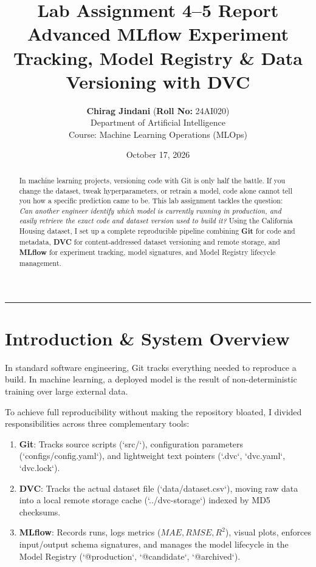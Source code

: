 \documentclass[11pt,a4paper]{article}
\title{\textbf{\Large Lab Assignment 4--5 Report}\\
\large Advanced MLflow Experiment Tracking, Model Registry \& Data Versioning with DVC}
\author{\textbf{Chirag Jindani} \quad (\textbf{Roll No:} 24AI020)\\
Department of Artificial Intelligence\\
Course: Machine Learning Operations (MLOps)}
\date{October 17, 2026}
\begin{document}
\maketitle
\thispagestyle{empty}

\begin{abstract}
In machine learning projects, versioning code with Git is only half the battle. If you change the dataset, tweak hyperparameters, or retrain a model, code alone cannot tell you how a specific prediction came to be. This lab assignment tackles the question: \textit{Can another engineer identify which model is currently running in production, and easily retrieve the exact code and dataset version used to build it?} Using the California Housing dataset, I set up a complete reproducible pipeline combining \textbf{Git} for code and metadata, \textbf{DVC} for content-addressed dataset versioning and remote storage, and \textbf{MLflow} for experiment tracking, model signatures, and Model Registry lifecycle management.
\end{abstract}

\vspace{0.5em}
\hrule
\vspace{1em}

\section{Introduction \& System Overview}
In standard software engineering, Git tracks everything needed to reproduce a build. In machine learning, a deployed model is the result of non-deterministic training over large external data. 

To achieve full reproducibility without making the repository bloated, I divided responsibilities across three complementary tools:
\begin{enumerate}
    \item \textbf{Git}: Tracks source scripts (`src/`), configuration parameters (`configs/config.yaml`), and lightweight text pointers (`.dvc`, `dvc.yaml`, `dvc.lock`).
    \item \textbf{DVC}: Tracks the actual dataset file (`data/dataset.csv`), moving raw data into a local remote storage cache (`../dvc-storage`) indexed by MD5 checksums.
    \item \textbf{MLflow}: Records runs, logs metrics ($MAE, RMSE, R^2$), visual plots, enforces input/output schema signatures, and manages the model lifecycle in the Model Registry (`@production`, `@candidate`, `@archived`).
\end{enumerate}
\end{document}
